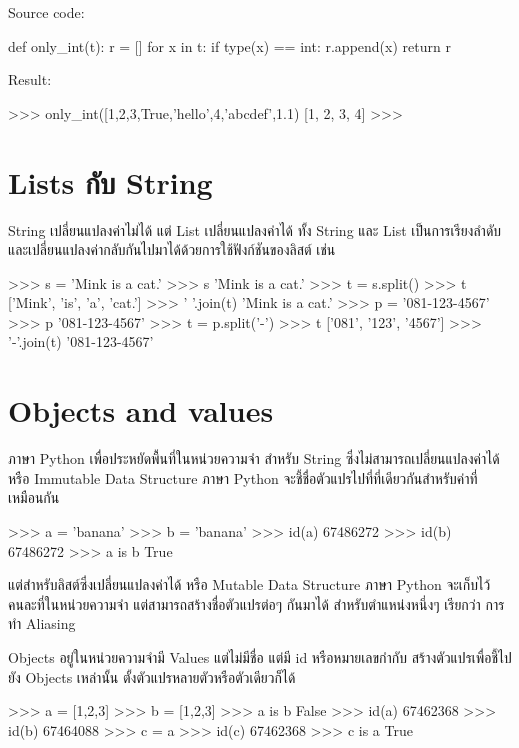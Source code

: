 Source code:
\begin{pycode}
def only_int(t):
    r = []
    for x in t:
        if type(x) == int: r.append(x)
    return r
\end{pycode}

Result:
\begin{pycode}
>>> only_int([1,2,3,True,'hello',4,'abcdef',1.1)
[1, 2, 3, 4]
>>>
\end{pycode}

\section{Lists กับ String}

String เปลี่ยนแปลงค่าไม่ได้ แต่ List เปลี่ยนแปลงค่าได้ ทั้ง String และ List เป็นการเรียงลำดับและเปลี่ยนแปลงค่ากลับกันไปมาได้ด้วยการใช้ฟังก์ชันของลิสต์ เช่น 

\begin{pycode}
>>> s = 'Mink is a cat.'
>>> s
'Mink is a cat.'
>>> t = s.split()
>>> t
['Mink', 'is', 'a', 'cat.']
>>> ' '.join(t)
'Mink is a cat.'
>>> p = '081-123-4567'
>>> p
'081-123-4567'
>>> t = p.split('-')
>>> t
['081', '123', '4567']
>>> '-'.join(t)
'081-123-4567'
\end{pycode}


\section{Objects and values}

ภาษา Python เพื่อประหยัดพื้นที่ในหน่วยความจำ สำหรับ String ซึ่งไม่สามารถเปลี่ยนแปลงค่าได้ หรือ Immutable Data Structure ภาษา Python จะชี้ชื่อตัวแปรไปที่ที่เดียวกันสำหรับค่าที่เหมือนกัน 

\begin{pycode}
>>> a = 'banana'
>>> b = 'banana'
>>> id(a)
67486272
>>> id(b)
67486272
>>> a is b
True
\end{pycode}


แต่สำหรับลิสต์ซึ่งเปลี่ยนแปลงค่าได้ หรือ Mutable Data Structure ภาษา Python จะเก็บไว้คนละที่ในหน่วยความจำ แต่สามารถสร้างชื่อตัวแปรต่อๆ กันมาได้ สำหรับตำแหน่งหนึ่งๆ เรียกว่า การทำ Aliasing

Objects อยู่ในหน่วยความจำมี Values แต่ไม่มีชื่อ แต่มี id หรือหมายเลขกำกับ สร้างตัวแปรเพื่อชี้ไปยัง Objects เหล่านั้น ตั้งตัวแปรหลายตัวหรือตัวเดียวก็ได้

\begin{pycode}
>>> a = [1,2,3]
>>> b = [1,2,3]
>>> a is b
False
>>> id(a)
67462368
>>> id(b)
67464088
>>> c = a
>>> id(c)
67462368
>>> c is a
True
\end{pycode}


